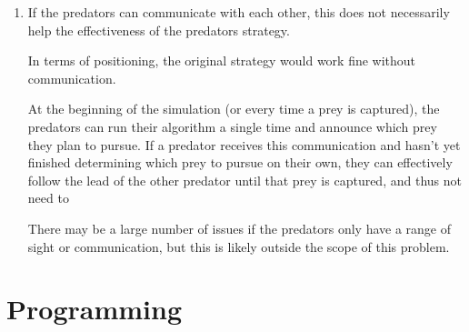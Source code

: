 \documentclass{article}
\begin{document}
\begin{enumerate}[label=(\alph*)]
\item{} %

If the predators can communicate with each other, this does not necessarily
help the effectiveness of the predators strategy.

In terms of positioning, the original strategy would work fine without
communication.

At the beginning of the simulation (or every time a prey is captured), the
predators can run their algorithm a single time and announce which prey they
plan to pursue. If a predator receives this communication and hasn't yet
finished determining which prey to pursue on their own, they can effectively
follow the lead of the other predator until that prey is captured, and thus not
need to 

There may be a large number of issues if the predators only have a range of
sight or communication, but this is likely outside the scope of this problem.

\end{enumerate}

\section*{Programming}
\end{document}

